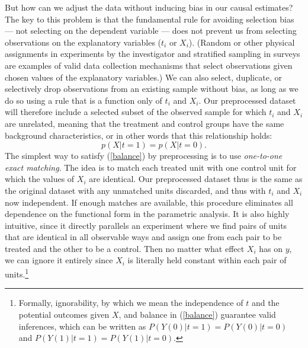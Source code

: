 \documentclass[11pt,titlepage]{article}
\begin{document}
But how can we adjust the data without inducing bias in our causal
estimates?  The key to this problem is that the fundamental rule for
avoiding selection bias --- not selecting on the dependent variable
--- does not prevent us from selecting observations on the explanatory
variables ($t_i$ or $X_i$).  (Random or other physical assignments in
experiments by the investigator and stratified sampling in surveys are
examples of valid data collection mechanisms that select observations
given chosen values of the explanatory variables.)  We can also
select, duplicate, or selectively drop observations from an existing
sample without bias, as long as we do so using a rule that is a
function only of $t_i$ and $X_i$.  Our preprocessed dataset will
therefore include a selected subset of the observed sample for which
$t_i$ and $X_i$ are unrelated, meaning that the treatment and control
groups have the same background characteristics, or in other words
that this relationship holds:
\begin{equation}
  \label{balance}
  p(X|t=1) = p(X|t=0).
\end{equation}
The simplest way to satisfy (\ref{balance}) by preprocessing is to use
\emph{one-to-one exact matching}.  The idea is to match each treated
unit with one control unit for which the values of $X_i$ are
identical.  Our preprocessed dataset thus is the same as the original
dataset with any unmatched units discarded, and thus with $t_i$ and
$X_i$ now independent.  If enough matches are available, this
procedure eliminates all dependence on the functional form in the
parametric analysis.  It is also highly intuitive, since it directly
parallels an experiment where we find pairs of units that are
identical in all observable ways and assign one from each pair to be
treated and the other to be a control.  Then no matter what effect
$X_i$ has on $y$, we can ignore it entirely since $X_i$ is literally
held constant within each pair of units.\footnote{Formally,
  ignorability, by which we mean the independence of $t$ and the
  potential outcomes given $X$, and balance in (\ref{balance})
  guarantee valid inferences, which can be written as
  $P(Y(0)|t=1)=P(Y(0)|t=0)$ and $P(Y(1)|t=1)=P(Y(1)|t=0)$.}
\end{document}
